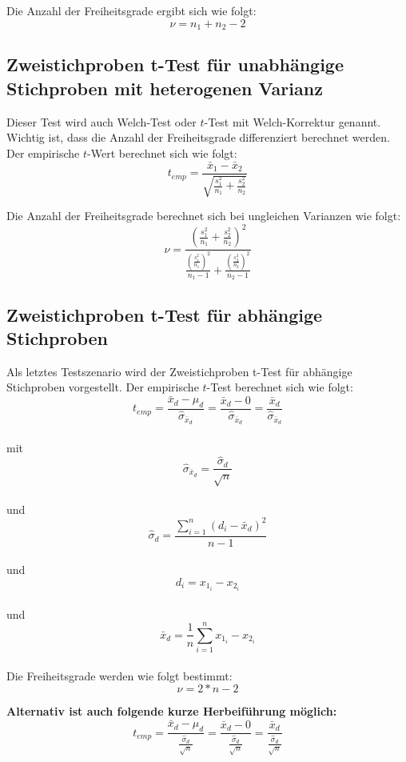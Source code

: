 \documentclass[11pt,a4paper]{article}
\begin{document}
Die Anzahl der Freiheitsgrade ergibt sich wie folgt: \\
$$\nu = n_1 + n_2 -2 $$

\subsection{Zweistichproben t-Test für unabhängige Stichproben mit heterogenen Varianz}
Dieser Test wird auch Welch-Test oder $t$-Test mit Welch-Korrektur genannt. Wichtig ist, dass die Anzahl der Freiheitsgrade differenziert berechnet werden.\\

Der empirische $t$-Wert berechnet sich wie folgt:\\
$$t_{emp} = \frac{\bar{x}_1 - \bar{x}_2}{\sqrt{\frac{s^2_1}{n_1} + \frac{s^2_2}{n_2}}}$$

Die Anzahl der Freiheitsgrade berechnet sich bei ungleichen Varianzen wie folgt:\\
$$ \nu = \frac{(\frac{s^2_1}{n_1}+ \frac{s^2_2}{n_2})^2}{\frac{(\frac{s^2_1}{n_1})^2}{n_1-1} + \frac{(\frac{s^2_2}{n_2})^2}{n_2-1}}$$

\subsection{Zweistichproben t-Test für abhängige Stichproben}
Als letztes Testszenario wird der Zweistichproben t-Test für abhängige Stichproben vorgestellt. Der empirische $t$-Test berechnet sich wie folgt:\\

$$t_{emp} = \frac{\bar{x}_d - \mu_d}{\hat{\sigma}_{\bar{x}_d}} = \frac{\bar{x}_d - 0}{\hat{\sigma}_{\bar{x}_d}} = \frac{\bar{x}_d}{\hat{\sigma}_{\bar{x}_d}}$$ \\

mit $$\hat{\sigma}_{\bar{x}_d} = \frac{\hat{\sigma}_d}{\sqrt{n}}$$ \\

und $$\hat{\sigma}_d = \frac{\sum_{i=1}^n (d_i - \bar{x}_d)^2}{n-1}$$ \\

und $$d_i = x_{1_i} - x_{2_i}$$\\

und $$\bar{x}_d = \frac{1}{n}\sum_{i=1}^n {x_{1_i} - x_{2_i}}$$\\

Die Freiheitsgrade werden wie folgt bestimmt:\\
$$\nu = 2 * n - 2$$

\textbf{Alternativ ist auch folgende kurze Herbeiführung möglich:}
$$t_{emp} = \frac{\bar{x}_d - \mu_d}{\frac{\hat{\sigma}_d}{\sqrt{n}}} = \frac{\bar{x}_d - 0}{\frac{\hat{\sigma}_d}{\sqrt{n}}} = \frac{\bar{x}_d}{\frac{\hat{\sigma}_d}{\sqrt{n}}}$$ \\
\end{document}
